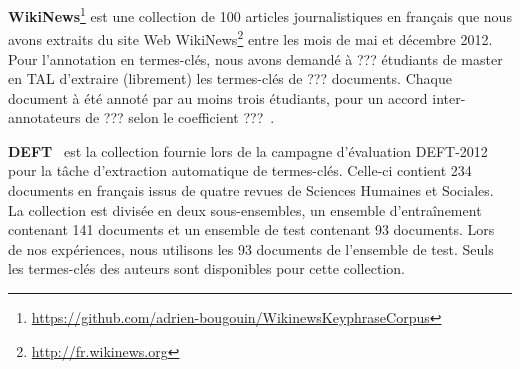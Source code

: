       \textbf{WikiNews}\footnote{\url{https://github.com/adrien-bougouin/WikinewsKeyphraseCorpus}}
      est une collection de 100 articles journalistiques en français que nous
      avons extraits du site Web
      WikiNews\footnote{\url{http://fr.wikinews.org}} entre les mois de mai et
      décembre 2012. Pour l'annotation en termes-clés, nous avons demandé à ???
      étudiants de master en TAL d'extraire (librement) les termes-clés de ???
      documents. Chaque document à été annoté par au moins trois étudiants, pour
      un accord inter-annotateurs de ??? selon le coefficient
      ???~\cite{doe1942paper}.

      \textbf{DEFT}~\cite{paroubek2012deft} est la collection fournie lors de la
      campagne d'évaluation DEFT-2012 pour la tâche d'extraction automatique de
      termes-clés. Celle-ci contient 234 documents en français issus de quatre
      revues de Sciences Humaines et Sociales. La collection est divisée en deux
      sous-ensembles, un ensemble d'entraînement contenant 141 documents et un
      ensemble de test contenant 93 documents. Lors de nos expériences, nous
      utilisons les 93 documents de l'ensemble de test. Seuls les termes-clés
      des auteurs sont disponibles pour cette collection.

